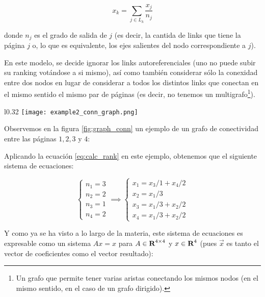 \begin{equation}\label{eq:calc_rank}
    x_k = \sum_{j\in L_k} \dfrac{x_j}{n_j} 
\end{equation}

donde $n_j$ es el grado de salida de $j$ (es decir, la cantida de links que
tiene la p\'agina $j$ o, lo que es equivalente, los ejes salientes del nodo
correspondiente a $j$).

\par En este modelo, se decide ignorar los links autoreferenciales (uno no puede
subir su ranking vot\'andose a si mismo), as\'i como tambi\'en considerar s\'olo
la conexidad entre dos nodos en lugar de considerar a todos los distintos links
que conectan en el mismo sentido el mismo par de p\'aginas (es decir, no
tenemos un multigrafo\footnote{Un grafo que permite tener varias aristas
conectando los mismos nodos (en el mismo sentido, en el caso de un grafo
dirigido).}).

\begin{wrapfigure}[12]{l}{0.32\textwidth}
    \texttt{[image: example2\_conn\_graph.png]}
    \caption{Grafo de Conectividad}
    \label{fig:graph_conn}
\end{wrapfigure}
\noindent

\par Observemos en la figura \ref{fig:graph_conn} un ejemplo de un grafo de
conectividad entre las p\'aginas $1, 2, 3$ y $4$:

\par Aplicando la ecuaci\'on \ref{eq:calc_rank} en este ejemplo, obtenemos que
el siguiente sistema de ecuaciones:

\begin{equation}
    \begin{cases}
        n_1 = 3\\
        n_2 = 2\\
        n_3 = 1\\
        n_4 = 2
    \end{cases}
    \implies
    \begin{cases}
        x_1 = x_3/1 + x_4/2\\
        x_2 = x_1/3\\
        x_3 = x_1/3 + x_2/2\\
        x_4 = x_1/3 + x_2/2
    \end{cases}
\end{equation}

\par Y como ya se ha visto a lo largo de la materia, este sistema de ecuaciones
es expresable como un sistema $Ax = x$ para $A\in\hbox{\bf R}^{4\times4}$ y
$x\in\hbox{\bf R}^4 $ (pues $\overrightarrow{x}$ es tanto el vector de coeficientes
como el vector resultado):

